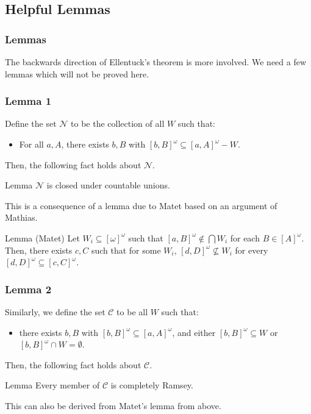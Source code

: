 \documentclass[handout]{beamer}
\begin{document}
\subsection{Helpful Lemmas}

\begin{frame}
\frametitle{Lemmas}
The backwards direction of Ellentuck's theorem is more involved. We need a few lemmas which will not be proved here.
\end{frame}

\begin{frame}
\frametitle{Lemma 1}
Define the set $\mathcal{N}$ to be the collection of all $W$ such that: 
\begin{itemize}
    \item For all $a, A$, there exists $b,B$ with $[b,B]^\omega\subseteq[a,A]^\omega-W$.  
\end{itemize} \pause
Then, the following fact holds about $\mathcal{N}$. 
\begin{block}{Lemma}
$\mathcal{N}$ is closed under countable unions. 
\end{block} \pause
This is a consequence of a lemma due to Matet based on an argument of Mathias. 
\begin{block}{Lemma (Matet)}
Let $W_i\subseteq[\omega]^\omega$ such that $[a,B]^\omega\notin\bigcap W_i$ for each $B\in [A]^\omega$. Then, there exists $c,C$ such that for some $W_i$, $[d,D]^\omega\nsubseteq W_i$ for every $[d,D]^\omega\subseteq [c,C]^\omega$.
\end{block} 
\end{frame}

\begin{frame}
\frametitle{Lemma 2}
Similarly, we define the set $\mathcal{C}$ to be all $W$ such that:
\begin{itemize}
    \item there exists $b,B$ with $[b,B]^\omega\subseteq[a,A]^\omega$, and either $[b,B]^\omega\subseteq W$ or $[b,B]^\omega\cap W=\emptyset$.  
\end{itemize} \pause
Then, the following fact holds about $\mathcal{C}$. 
\begin{block}{Lemma}
Every member of $\mathcal{C}$ is completely Ramsey. 
\end{block} \pause
This can also be derived from Matet's lemma from above.\footnotemark
{}
\end{frame}
\end{document}
